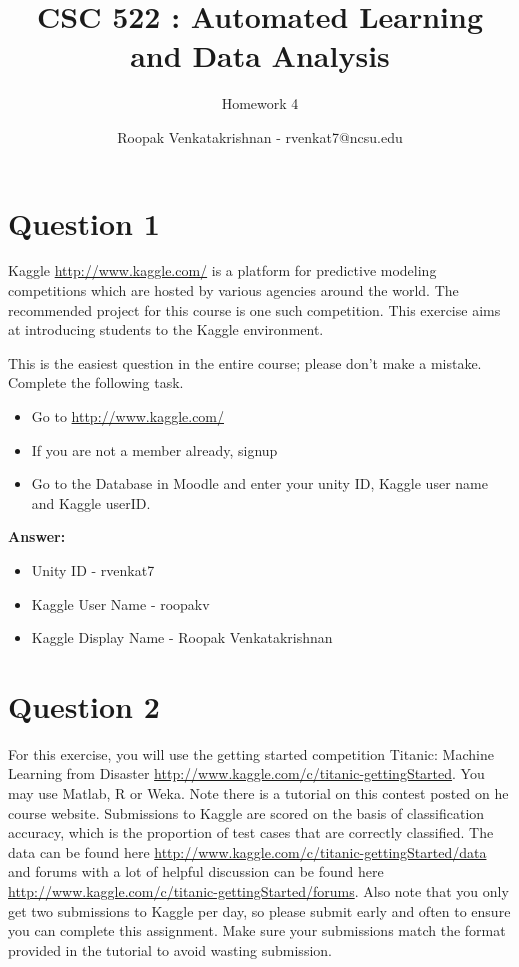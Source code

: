 \documentclass[fontsize=10pt]{scrartcl}
\begin{document}
	\title{CSC 522 : Automated Learning and Data Analysis}
	\subtitle{Homework 4}
	\author{Roopak Venkatakrishnan - rvenkat7@ncsu.edu}
	\maketitle

	\section{Question 1}
		Kaggle \url{http://www.kaggle.com/} is a platform for predictive modeling competitions which are hosted by various agencies around the world. The recommended project for this course is one such competition. This exercise aims at introducing students to the Kaggle environment.
		

		This is the easiest question in the entire course; please don’t make a mistake. Complete the following task.

		\begin{itemize}
			\item
			Go to \url{http://www.kaggle.com/}

			\item
			If you are not a member already, signup

			\item
			Go to the Database in Moodle and enter your unity ID, Kaggle user name and Kaggle userID.
		\end{itemize}

		\textbf{Answer:} \\
		\begin{itemize}
			\item
			Unity ID - rvenkat7

			\item
			Kaggle User Name - roopakv

			\item
			Kaggle Display Name - Roopak Venkatakrishnan
		\end{itemize}


		\section{Question 2}

		For this exercise, you will use the getting started competition Titanic: Machine Learning from Disaster \url{http://www.kaggle.com/c/titanic-gettingStarted}. You may use Matlab, R or Weka. Note there is a tutorial on this contest posted on  he course website. Submissions to Kaggle are scored on the basis of classiﬁcation accuracy, which is the proportion of test cases that are correctly classiﬁed. The data can be found here \url{http://www.kaggle.com/c/titanic-gettingStarted/data} and forums with a lot of helpful discussion can be found here \url{http://www.kaggle.com/c/titanic-gettingStarted/forums}. Also note that you only get two submissions to Kaggle per day, so please submit early and often to ensure you can complete this assignment. Make sure your submissions match the format provided in the tutorial to avoid wasting submission.
\end{document}
